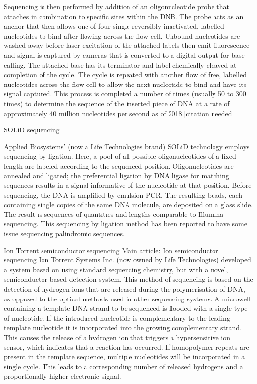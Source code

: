 Sequencing is then performed by addition of an oligonucleotide probe that attaches in combination to specific sites within the DNB. The probe acts as an anchor that then allows one of four single reversibly inactivated, labelled nucleotides to bind after flowing across the flow cell. Unbound nucleotides are washed away before laser excitation of the attached labels then emit fluorescence and signal is captured by cameras that is converted to a digital output for base calling. The attached base has its terminator and label chemically cleaved at completion of the cycle. The cycle is repeated with another flow of free, labelled nucleotides across the flow cell to allow the next nucleotide to bind and have its signal captured. This process is completed a number of times (usually 50 to 300 times) to determine the sequence of the inserted piece of DNA at a rate of approximately 40 million nucleotides per second as of 2018.{[}citation needed{]}

SOLiD sequencing

Applied Biosystems' (now a Life Technologies brand) SOLiD technology employs sequencing by ligation. Here, a pool of all possible oligonucleotides of a fixed length are labeled according to the sequenced position. Oligonucleotides are annealed and ligated; the preferential ligation by DNA ligase for matching sequences results in a signal informative of the nucleotide at that position. Before sequencing, the DNA is amplified by emulsion PCR. The resulting beads, each containing single copies of the same DNA molecule, are deposited on a glass slide. The result is sequences of quantities and lengths comparable to Illumina sequencing. This sequencing by ligation method has been reported to have some issue sequencing palindromic sequences.

Ion Torrent semiconductor sequencing
Main article: Ion semiconductor sequencing
Ion Torrent Systems Inc. (now owned by Life Technologies) developed a system based on using standard sequencing chemistry, but with a novel, semiconductor-based detection system. This method of sequencing is based on the detection of hydrogen ions that are released during the polymerisation of DNA, as opposed to the optical methods used in other sequencing systems. A microwell containing a template DNA strand to be sequenced is flooded with a single type of nucleotide. If the introduced nucleotide is complementary to the leading template nucleotide it is incorporated into the growing complementary strand. This causes the release of a hydrogen ion that triggers a hypersensitive ion sensor, which indicates that a reaction has occurred. If homopolymer repeats are present in the template sequence, multiple nucleotides will be incorporated in a single cycle. This leads to a corresponding number of released hydrogens and a proportionally higher electronic signal.

